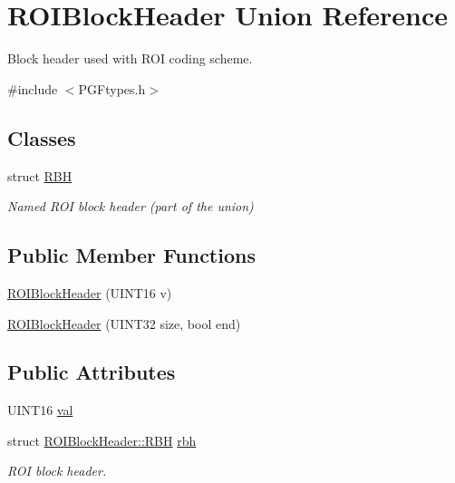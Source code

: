 \hypertarget{unionROIBlockHeader}{}\section{R\+O\+I\+Block\+Header Union Reference}
\label{unionROIBlockHeader}


Block header used with R\+OI coding scheme.  




{\ttfamily \#include $<$P\+G\+Ftypes.\+h$>$}

\subsection*{Classes}
\begin{DoxyCompactItemize}
\item 
struct \mbox{\hyperlink{structROIBlockHeader_1_1RBH}{R\+BH}}
\begin{DoxyCompactList}\small\item\em Named R\+OI block header (part of the union) \end{DoxyCompactList}\end{DoxyCompactItemize}
\subsection*{Public Member Functions}
\begin{DoxyCompactItemize}
\item 
\mbox{\hyperlink{unionROIBlockHeader_aa831264ba94e20471457cf33d0372443}{R\+O\+I\+Block\+Header}} (U\+I\+N\+T16 v)
\item 
\mbox{\hyperlink{unionROIBlockHeader_aa3641f52d4bf3a1f5eafee97e64e5c4e}{R\+O\+I\+Block\+Header}} (U\+I\+N\+T32 size, bool end)
\end{DoxyCompactItemize}
\subsection*{Public Attributes}
\begin{DoxyCompactItemize}
\item 
U\+I\+N\+T16 \mbox{\hyperlink{unionROIBlockHeader_a84e2058de6eb0cb75f6d5b0388915494}{val}}
\item 
struct \mbox{\hyperlink{structROIBlockHeader_1_1RBH}{R\+O\+I\+Block\+Header\+::\+R\+BH}} \mbox{\hyperlink{unionROIBlockHeader_a15ceb2e488c3767cc1ab774323c02ded}{rbh}}
\begin{DoxyCompactList}\small\item\em R\+OI block header. \end{DoxyCompactList}\end{DoxyCompactItemize}


